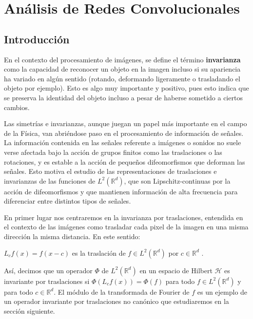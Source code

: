 

\chapter{Análisis de Redes Convolucionales}\label{ch:analisis}

\section{Introducción}


\noindent En el contexto del procesamiento de imágenes, se define el término \textbf{invarianza} como la capacidad de reconocer un objeto en la imagen incluso si su apariencia ha variado en algún sentido (rotando, deformando ligeramente o trasladando el objeto por ejemplo). Esto es algo muy importante y positivo, pues esto indica que se preserva la identidad del objeto incluso a pesar de haberse sometido a ciertos cambios.

\medskip

\noindent Las simetrías e invarianzas, aunque juegan un papel más importante en el campo de la Física, van abriéndose paso en el procesamiento de información de señales. La información contenida en las señales referente a imágenes o sonidos no suele verse afectada bajo la acción de grupos finitos como las traslaciones o las rotaciones, y es estable a la acción de pequeños difeomorfismos que deforman las señales. Esto motiva el estudio de las representaciones de traslaciones e invarianzas de las funciones de $L^2(\mathbb{R}^d)$, que son Lipschitz-continuas por la acción de difeomorfismos y que mantienen información de alta frecuencia para diferenciar entre distintos tipos de señales. 

\medskip

\noindent En primer lugar nos centraremos en la invarianza por traslaciones, entendida en el contexto de las imágenes como trasladar cada pixel de la imagen en una misma dirección la misma distancia. En este sentido: 
\begin{definicion}
$L_cf(x)=f(x-c)$ es la traslación de $f \in L^2(\mathbb{R}^d)$ por $c \in \mathbb{R}^d$ .
\end{definicion}

\noindent Así, decimos que un operador $\Phi$ de  $L^2(\mathbb{R}^d)$ en un espacio de Hilbert $\mathcal{H}$ es invariante por traslaciones si $\Phi(L_cf(x))=\Phi(f)$ para todo $f \in L^2(\mathbb{R}^d)$ y para todo $c \in \mathbb{R}^d$. El módulo de la transformada de Fourier de $f$ es un ejemplo de un operador invariante por traslaciones no canónico que estudiaremos en la sección siguiente. 

